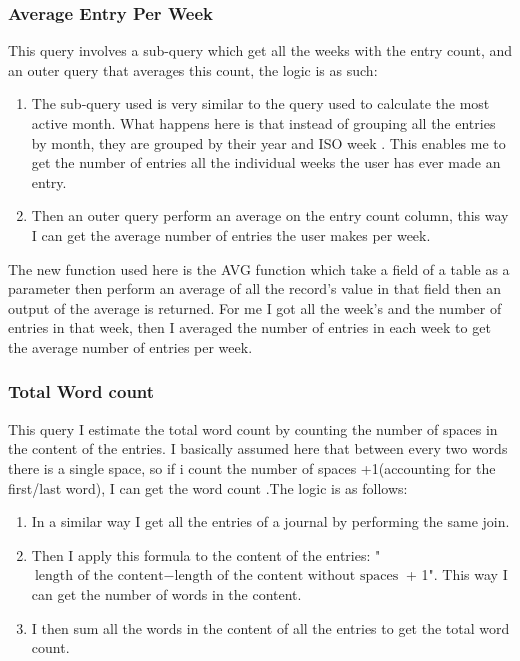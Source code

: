 \subsubsection{Average Entry Per Week}
This query involves a sub-query which get all the weeks with the entry count, and an outer query that averages this count, the logic is as such:
\begin{enumerate}
    \item The sub-query used is very similar to the query used to calculate the most active month. What happens here is that instead of grouping all the entries by month, they are grouped by their year and ISO week \cite{iso_week_date_wikipedia}. This enables me to get the number of entries all the individual weeks the user has ever made an entry.
    \item Then an outer query perform an average on the entry count column, this way I can get the average number of entries the user makes per week.
\end{enumerate}

The new function used here is the AVG function which take a field of a table as a parameter then perform an average of all the record's value in that field then an output of the average is returned. For me I got all the week's and the number of entries in that week, then I averaged the number of entries in each week to get the average number of entries per week.


\subsubsection{Total Word count}
This query I estimate the total word count by counting the number of spaces in the content of the entries. I basically assumed here that between every two words there is a single space, so if i count the number of spaces +1(accounting for the first/last word), I can get the word count .The logic is as follows:

\begin{enumerate}
    \item In a similar way I get all the entries of a journal by performing the same join.
    \item Then I apply this formula to the content of the entries: "\( \text{length of the content} - \text{length of the content without spaces} \) + 1". This way I can get the number of words in the content.
    \item I then sum all the words in the content of all the entries to get the total word count.
\end{enumerate}

